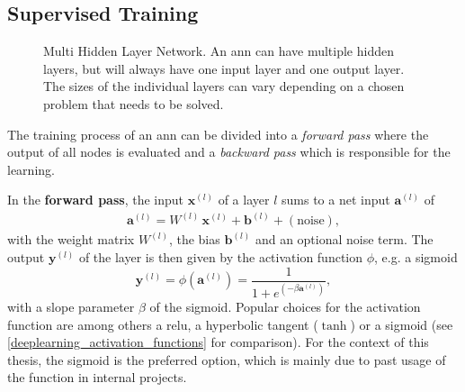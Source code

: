 

\subsection{Supervised Training}
\label{supervisedtraining}
\begin{figure}
	\centering
	
	\caption[Multi Hidden Layer Network]{Multi Hidden Layer Network. An \acrfull{ann} can have multiple hidden layers, but will always have one input layer and one output layer. The sizes of the individual layers can vary depending on a chosen problem that needs to be solved.} 
	\label{multilayernetwork}
\end{figure}
The training process of an \gls{ann} can be divided into a \emph{forward pass} where the output of all nodes is evaluated and a \emph{backward pass} which is responsible for the learning.

In the \textbf{forward pass}, the input $\mathbf{x}^{(l)}$ of a layer $l$ sums to a net input $\mathbf{a}^{(l)}$ of
\begin{align*}
\mathbf{a}^{(l)} = W^{(l)} \, \mathbf{x}^{(l)} + \mathbf{b}^{(l)} + \left(\text{noise}\right), 
\end{align*}
with the weight matrix $W^{(l)}$, the bias $\mathbf{b}^{(l)}$ and an optional noise term. The output $\mathbf{y}^{(l)}$ of the layer is then given by the activation function $\phi$, e.g. a sigmoid
\begin{equation*}
\mathbf{y}^{(l)} = \phi(\mathbf{a}^{(l)}) = \frac{1}{1 + e^{(-\beta \mathbf{a}^{(l)})}},
\end{equation*}
with a slope parameter $\beta$ of the sigmoid. Popular choices for the activation function are among others a \gls{relu}, a hyperbolic tangent ($\tanh$) or a sigmoid (see \cref{deeplearning_activation_functions} for comparison). For the context of this thesis, the sigmoid is the preferred option, which is mainly due to past usage of the function in internal projects.

